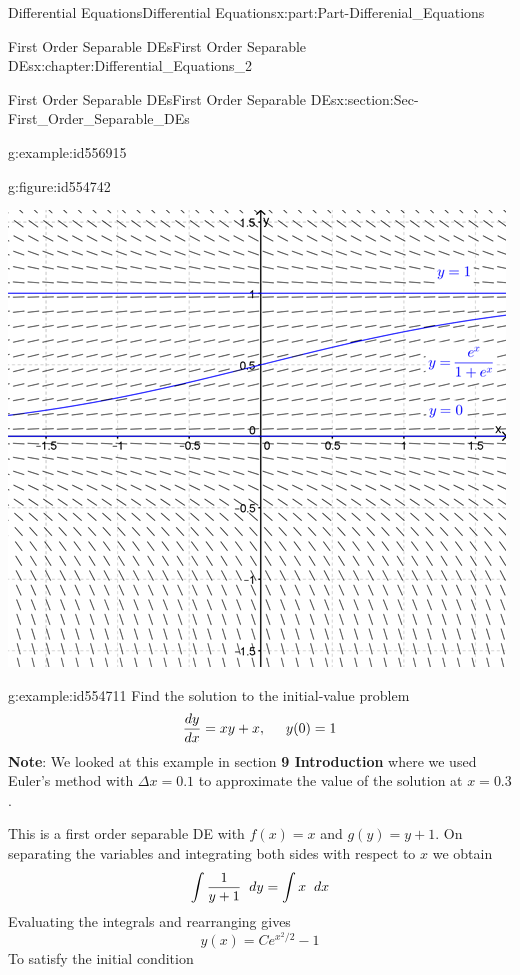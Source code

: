 \documentclass[oneside,10pt,]{book}
\newcommand{\terminology}[1]{\textbf{#1}}
\numberwithin{equation}{section}
\begin{document}
\begin{partptx}{Differential Equations}{}{Differential Equations}{}{}{x:part:Part-Differenial_Equations}
\begin{chapterptx}{First Order Separable DEs}{}{First Order Separable DEs}{}{}{x:chapter:Differential_Equations_2}
\begin{sectionptx}{First Order Separable DEs}{}{First Order Separable DEs}{}{}{x:section:Sec-First_Order_Separable_DEs}
\begin{example}{}{g:example:id556915}
\begin{figureptx}{}{g:figure:id554742}{}
\begin{image}{0.125}{0.75}{0.125}
\includegraphics[width=\linewidth]{./DifferentialEquations/Images/2/1_example5.png}
\end{image}%
\tcblower
\end{figureptx}%
%
\end{example}
\begin{example}{}{g:example:id554711}%
Find the solution to the initial-value problem%
\begin{equation*}
\frac{dy}{dx}=xy+x, \hspace{5mm} y(0)=1
\end{equation*}
\terminology{Note}: We looked at this example in section \terminology{9 Introduction} where we used Euler’s method with \(\Delta x=0.1\) to approximate the value of the solution at \(x=0.3\).%
\par\smallskip%
\noindent\hypertarget{g:solution:id557975}{}This is a first order separable DE with \(f(x)=x\) and \(g(y)=y+1\). On separating the variables and integrating both sides with respect to \(x\) we obtain%
\begin{equation*}
\int \frac{1}{y+1}\hspace{2mm}dy=\int x\hspace{2mm}dx
\end{equation*}
Evaluating the integrals and rearranging gives%
\begin{equation*}
y(x)=Ce^{x^2/2}-1
\end{equation*}
To satisfy the initial condition %

\end{example}
\end{sectionptx}
\end{chapterptx}
\end{partptx}
\end{document}
